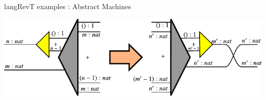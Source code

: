 \documentclass[svgnames,11pt]{beamer}
\begin{document}
\begin{frame}{ {{langRevT}} examples : Abstract Machines}

  \begin{multicols}{2}
    

  \end{multicols}


\vfill

\begin{center}
  \includegraphics{iso-int/diagrams/nat-nat4.pdf}
\end{center}

  
\vfill

\end{frame}
\end{document}
